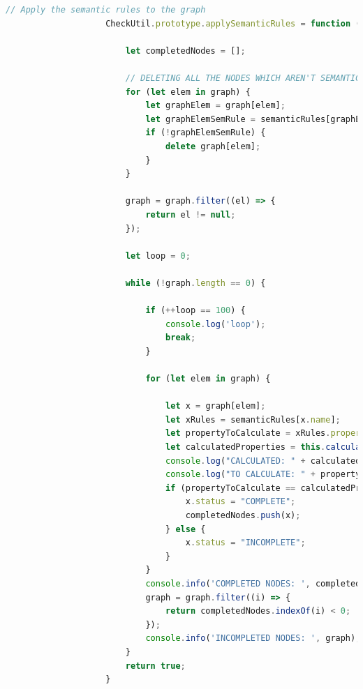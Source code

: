                 \begin{lstlisting}[language=JavaScript, basicstyle=\tiny, caption={La funzione che computa tutte le proprietà semantiche}, label={lst:applySemanticRules}]
                    // Apply the semantic rules to the graph
                    CheckUtil.prototype.applySemanticRules = function (graph, semanticRules) {

                        let completedNodes = [];

                        // DELETING ALL THE NODES WHICH AREN'T SEMANTIC RULES
                        for (let elem in graph) {
                            let graphElem = graph[elem];
                            let graphElemSemRule = semanticRules[graphElem.name];
                            if (!graphElemSemRule) {
                                delete graph[elem];
                            }
                        }

                        graph = graph.filter((el) => {
                            return el != null;
                        });

                        let loop = 0;

                        while (!graph.length == 0) {

                            if (++loop == 100) {
                                console.log('loop');
                                break;
                            }

                            for (let elem in graph) {

                                let x = graph[elem];
                                let xRules = semanticRules[x.name];
                                let propertyToCalculate = xRules.property.length;
                                let calculatedProperties = this.calculateProperties(x, xRules);
                                console.log("CALCULATED: " + calculatedProperties);
                                console.log("TO CALCULATE: " + propertyToCalculate);
                                if (propertyToCalculate == calculatedProperties) {
                                    x.status = "COMPLETE";
                                    completedNodes.push(x);
                                } else {
                                    x.status = "INCOMPLETE";
                                }
                            }
                            console.info('COMPLETED NODES: ', completedNodes);
                            graph = graph.filter((i) => {
                                return completedNodes.indexOf(i) < 0;
                            });
                            console.info('INCOMPLETED NODES: ', graph);
                        }
                        return true;
                    }
                \end{lstlisting}

